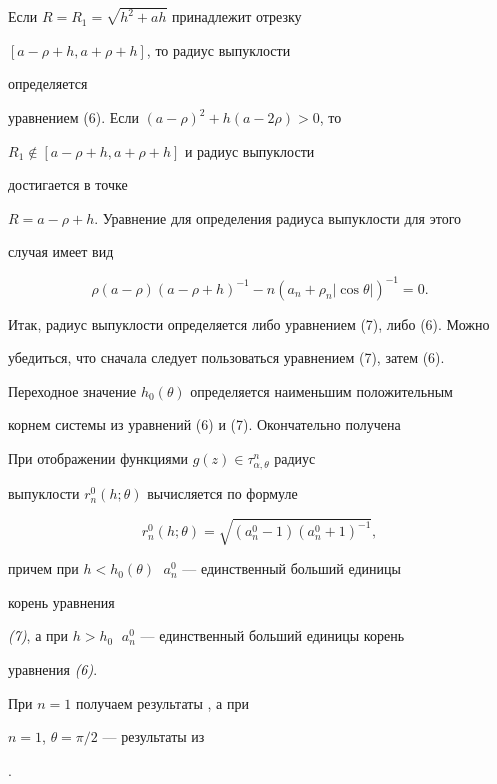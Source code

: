 Если $R=R_1=\sqrt{h^2+ah}$ принадлежит отрезку


$[a-\rho+h,a+\rho+h]$, то радиус выпуклости


определяется


уравнением (6). Если $(a-\rho)^2+h(a-2\rho)>0$, то


$R_1\notin[a-\rho+h,a+\rho+h]$ и радиус выпуклости


достигается в точке


$R=a-\rho+h$. Уравнение для определения радиуса выпуклости для этого


случая имеет вид


\begin{equation}


\rho(a-\rho)(a-\rho+h)^{-1}-n(a_n+\rho_n|\cos\theta|)^{-1}=0.


\end{equation}





Итак, радиус выпуклости определяется либо уравнением (7), либо (6). Можно


убедиться, что сначала следует пользоваться уравнением (7), затем (6).


Переходное значение $h_0(\theta)$ определяется наименьшим положительным


корнем системы из уравнений (6) и (7). Окончательно получена





\begin{thmnonum}


При отображении функциями $g(z)\in\tau^n_{\alpha,\theta}$ радиус


выпуклости $r^0_n(h;\theta)$ вычисляется по формуле


$$


r^0_n(h;\theta)=\sqrt{(a^0_n-1)(a^0_n+1)^{-1}},


$$


причем при $h<h_0(\theta)\;$ $a^0_n$ --- единственный больший единицы


корень уравнения


{\em (7)}, а при $h>h_0\;$ $a^0_n$ --- единственный больший единицы корень


уравнения {\em (6)}.


\end{thmnonum}





\begin{notenonum}


При $n=1$ получаем результаты \cite{Ko1}, а при


$n=1$, $\theta=\pi/2$ --- результаты из


\cite{Ko2}.


\end{notenonum}






